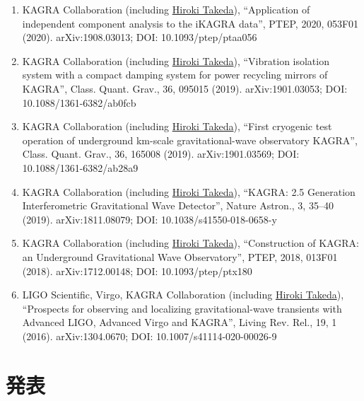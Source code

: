 \documentclass[uplatex, 11pt]{jsarticle}
\begin{document}
\begin{enumerate}
\item KAGRA Collaboration (including \uline{Hiroki Takeda}), “Application of independent component analysis to the iKAGRA data”, PTEP, 2020, 053F01 (2020). arXiv:1908.03013; DOI: 10.1093/ptep/ptaa056
\item KAGRA Collaboration (including \uline{Hiroki Takeda}), “Vibration isolation system with a compact damping system for power recycling mirrors of KAGRA”, Class. Quant. Grav., 36, 095015 (2019). arXiv:1901.03053; DOI: 10.1088/1361-6382/ab0fcb
\item KAGRA Collaboration (including \uline{Hiroki Takeda}), “First cryogenic test operation of underground km-scale gravitational-wave observatory KAGRA”, Class. Quant. Grav., 36, 165008 (2019). arXiv:1901.03569; DOI: 10.1088/1361-6382/ab28a9
\item KAGRA Collaboration (including \uline{Hiroki Takeda}), “KAGRA: 2.5 Generation Interferometric Gravitational Wave Detector”, Nature Astron., 3, 35--40 (2019). arXiv:1811.08079; DOI: 10.1038/s41550-018-0658-y
\item KAGRA Collaboration (including \uline{Hiroki Takeda}), “Construction of KAGRA: an Underground Gravitational Wave Observatory”, PTEP, 2018, 013F01 (2018). arXiv:1712.00148; DOI: 10.1093/ptep/ptx180
\item LIGO Scientific, Virgo, KAGRA Collaboration (including \uline{Hiroki Takeda}), “Prospects for observing and localizing gravitational-wave transients with Advanced LIGO, Advanced Virgo and KAGRA”, Living Rev. Rel., 19, 1 (2016). arXiv:1304.0670; DOI: 10.1007/s41114-020-00026-9
\end{enumerate}


\section*{発表}
\end{document}

